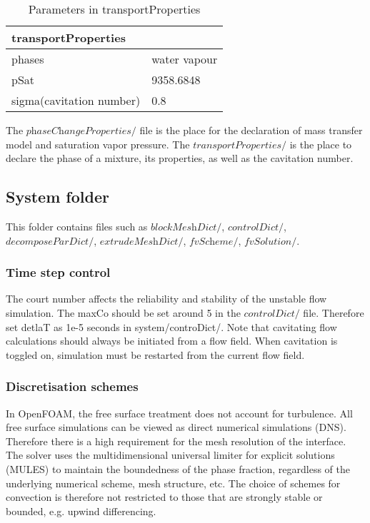 \begin{table}[h]
\centering
\begin{tabular}{|ll|}
\hline
\multicolumn{2}{|l|}{transportProperties}    \\ \hline
\multicolumn{1}{|l|}{phases} &water vapour  \\ \hline
\multicolumn{1}{|l|}{pSat} & 9358.6848 \\ \hline
\multicolumn{1}{|l|}{sigma(cavitation number) } & 0.8 \\ \hline
\end{tabular}
\caption{Parameters in transportProperties}
\label{tab:PC}
\end{table}












The $\textit{phaseChangeProperties/}$ file is the place for the declaration of mass transfer model and saturation vapor pressure. The
$\textit{transportProperties}/$ is the place to declare the phase of a mixture, its properties, as well as the cavitation number.
\subsection{System folder}
This folder contains files such as  $\textit{blockMeshDict}/$, $\textit{controlDict}/$, $\textit{decomposeParDict}/$, 
$\textit{extrudeMeshDict}/$, $\textit{fvScheme}/$, $\textit{fvSolution}/$.\\
\subsubsection{Time step control}
The court number affects the reliability and stability of the unstable flow simulation. The maxCo should 
be set around 5 in the $\textit{controlDict}/$ file. Therefore set  detlaT as 1e-5 seconds in system/controDict/. Note that cavitating flow calculations 
should always be initiated from a flow field. When cavitation is toggled on, simulation must be restarted from the 
current flow field.\\
\subsubsection{Discretisation schemes}
In OpenFOAM, the free surface treatment does not account for turbulence. All free surface simulations can be viewed 
as direct numerical simulations (DNS). Therefore there is a high requirement for the mesh resolution of the interface. 
The solver uses the multidimensional universal limiter for explicit solutions (MULES) to maintain the boundedness of 
the phase fraction, regardless of the underlying numerical scheme, mesh structure, etc. The choice of schemes for 
convection is therefore not restricted to those that are strongly stable or bounded, e.g. upwind differencing.\\
